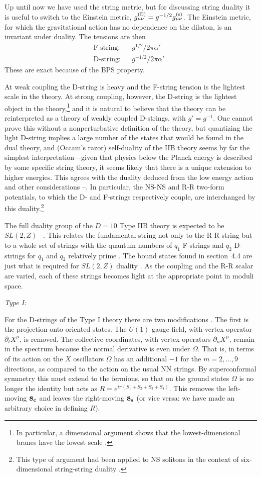 \documentclass[12pt]{article}
\def\bea{\begin{eqnarray}}
\def\eea{\end{eqnarray}}
\def\apm{\alpha'}
\begin{document}
Up until now we have used the string metric, but for discussing string
duality it is useful to switch to the Einstein metric, $g_{\mu\nu}^{\rm (E)}
= g^{-1/2} g_{\mu\nu}^{\rm (s)}$.   The Einstein metric, for which the
gravitational action has no dependence on the dilaton, is an invariant under
duality.
The tensions are then
\bea
\mbox{F-string:} && g^{1/2} / 2\pi\apm \nonumber\\
\mbox{D-string:} && g^{-1/2} / 2\pi\apm\ .
\eea
These are exact because of the
BPS property.  

At weak coupling the D-string is heavy and the F-string
tension is the lightest scale in the theory.  At strong coupling, however,
the D-string is the lightest object in the theory,\footnote
{In particular, a dimensional argument shows that the lowest-dimensional
branes have the lowest scale \cite{hullscale}.} and it is natural to believe
that the theory can be reinterpreted as a theory of weakly coupled
D-strings, with
$g' = g^{-1}$.  One cannot prove this without a nonperturbative definition
of the theory, but quantizing the light D-string implies a large number of
the states that would be found in the dual theory, and (Occam's
razor) self-duality of the IIB theory seems by far the simplest
interpretation---given that physics below the Planck
energy is described by some specific string theory, it seems likely that
there is a unique extension to higher energies.  This agrees with the duality
deduced from the low energy action and other
considerations \cite{hullt}--\cite{wit}. In particular, the NS-NS and
R-R two-form potentials, to which the D- and F-strings respectively couple,
are interchanged by this duality.\footnote
{This type of argument had been applied to NS solitons in the context
of six-dimensional string-string duality \cite{hetsol}.}

The full duality group of the $D=10$ Type IIB theory is expected to be
$SL(2,Z)$ \cite{hullt}--\cite{wit}.  This relates the fundamental
string not only to the R-R string but to a whole set of strings with the
quantum numbers of $q_1$ F-strings and $q_2$ D-strings for $q_1$ and $q_2$ 
relatively prime \cite{schwarz}.  The bound states found in section~4.4 are
just what is required for $SL(2,Z)$ duality \cite{witbound}.  As the
coupling and the R-R scalar are varied, each of these strings becomes light
at the appropriate point in moduli space.

{\it Type I:}

For the D-strings of the Type I theory there are two
modifications \cite{polwit}.
The first is the projection onto oriented states.  The $U(1)$ gauge field,
with vertex operator $\partial_t X^\mu$, is removed.  The collective
coordinates, with vertex operators
$\partial_n X^\mu$, remain in the spectrum because the normal derivative is
even under $\Omega$.  That is, in terms of its action on the $X$ oscillators
$\Omega$ has an additional $-1$ for the $m=2,\ldots,9$
directions, as compared to the action on the usual NN strings.  By
superconformal symmetry this must extend to the fermions, so that on the
ground states $\Omega$ is no longer the identity but acts as
$R=e^{i\pi(S_1+S_2+S_3+S_4)}$.  This removes the left-moving $\bf 8_c$ and
leaves the right-moving $\bf 8_s$ (or vice versa: we have made an arbitrary
choice in defining $R$).
\end{document}
